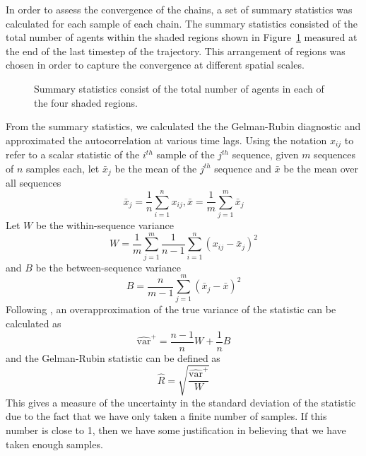 \documentclass{article}
\begin{document}
In order to assess the convergence of the chains, a set of summary statistics was calculated for each sample of each chain. The summary statistics consisted of the total number of agents within the shaded regions shown in Figure~\ref{figRegions} measured at the end of the last timestep of the trajectory. This arrangement of regions was chosen in order to capture the convergence at different spatial scales.

\begin{figure}[ht]
	\centering
	\caption{Summary statistics consist of the total number of agents in each of the four shaded regions.}
	\label{figRegions}
\end{figure}

From the summary statistics, we calculated the the Gelman-Rubin diagnostic \cite{gelman1992inference} and approximated the autocorrelation at various time lags. Using the notation $x_{ij}$ to refer to a scalar statistic of the $i^{th}$ sample of the $j^{th}$ sequence, given $m$ sequences of $n$ samples each, let $\bar{x}_j$ be the mean of the $j^{th}$ sequence and $\bar{x}$ be the mean over all sequences
\[
\bar{x}_j = \frac{1}{n}\sum_{i=1}^n x_{ij}, \bar{x} = \frac{1}{m}\sum_{j=1}^m \bar{x}_j
\]
Let $W$ be the within-sequence variance
\[
W = \frac{1}{m} \sum_{j=1}^m \frac{1}{n-1} \sum_{i=1}^n (x_{ij} - \bar{x}_j)^2
\]
and $B$ be the between-sequence variance
\[
B = \frac{n}{m-1}\sum_{j=1}^m (\bar{x}_j - \bar{x})^2
\]
Following \cite{gelman2013bayesian}, an overapproximation of the true variance of the statistic can be calculated as
\[
\widehat{\text{var}}^+ = \frac{n-1}{n}W + \frac{1}{n}B
\]
and the Gelman-Rubin statistic can be defined as
\[
\hat{R} = \sqrt{\frac{\widehat{\text{var}}^+}{W}}
\]
This gives a measure of the uncertainty in the standard deviation of the statistic due to the fact that we have only taken a finite number of samples. If this number is close to 1, then we have some justification in believing that we have taken enough samples.
\end{document}
